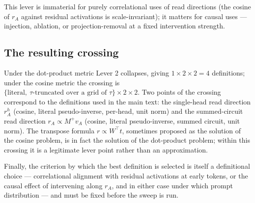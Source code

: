 \documentclass[
]{article}
\begin{document}
This lever is immaterial for purely correlational uses of read directions (the cosine of
$r_A$ against residual activations is scale-invariant); it matters for causal uses ---
injection, ablation, or projection-removal at a fixed intervention strength.

\subsection{The resulting crossing}\label{the-resulting-crossing}

Under the dot-product metric Lever 2 collapses, giving
$1 \times 2 \times 2 = 4$ definitions; under the cosine metric the crossing is
$\{\text{literal},\ \tau\text{-truncated over a grid of } \tau\} \times 2 \times 2$.
Two points of the crossing correspond to the definitions used in the main text: the
single-head read direction $r^h_A$ (cosine, literal pseudo-inverse, per-head, unit norm)
and the summed-circuit read direction $r_A \propto M^{+} v_A$ (cosine, literal
pseudo-inverse, summed circuit, unit norm). The transpose formula
$r \propto W^{\top} t$, sometimes proposed as the solution of the cosine problem, is
in fact the solution of the dot-product problem; within this crossing it is a
legitimate lever point rather than an approximation.

Finally, the criterion by which the best definition is selected is itself a
definitional choice --- correlational alignment with residual activations at early
tokens, or the causal effect of intervening along $r_A$, and in either case under which
prompt distribution --- and must be fixed before the sweep is run.
\end{document}
